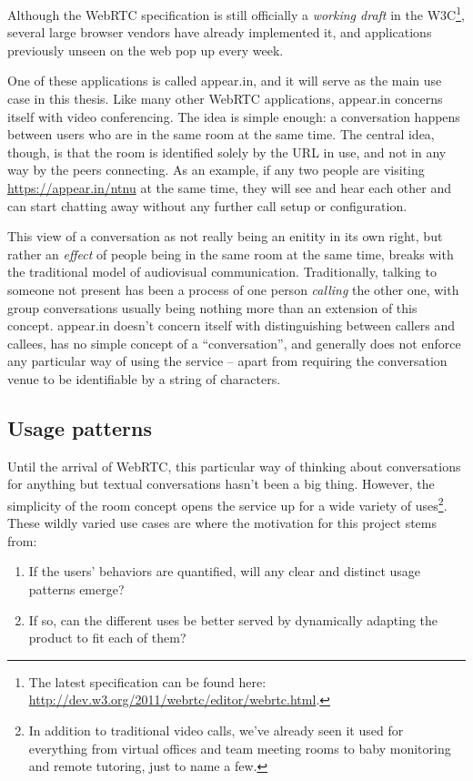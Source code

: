 Although the WebRTC specification is still officially a \emph{working draft} in the W3C\footnote{The latest specification can be found here: \url{http://dev.w3.org/2011/webrtc/editor/webrtc.html}.}, several large browser vendors have already implemented it, and applications previously unseen on the web pop up every week.

One of these applications is called appear.in, and it will serve as the main use case in this thesis. Like many other WebRTC applications, appear.in concerns itself with video conferencing. The idea is simple enough: a conversation happens between users who are in the same room at the same time. The central idea, though, is that the room is identified solely by the URL in use, and not in any way by the peers connecting. As an example, if any two people are visiting \url{https://appear.in/ntnu} at the same time, they will see and hear each other and can start chatting away without any further call setup or configuration.

This view of a conversation as not really being an enitity in its own right, but rather an \emph{effect} of people being in the same room at the same time, breaks with the traditional model of audiovisual communication. Traditionally, talking to someone not present has been a process of one person \emph{calling} the other one, with group conversations usually being nothing more than an extension of this concept. appear.in doesn't concern itself with distinguishing between callers and callees, has no simple concept of a ``conversation'', and generally does not enforce any particular way of using the service -- apart from requiring the conversation venue to be identifiable by a string of characters.

\subsection{Usage patterns}

Until the arrival of WebRTC, this particular way of thinking about conversations for anything but textual conversations hasn't been a big thing. However, the simplicity of the room concept opens the service up for a wide variety of uses\footnote{In addition to traditional video calls, we've already seen it used for everything from virtual offices and team meeting rooms to baby monitoring and remote tutoring, just to name a few.}. These wildly varied use cases are where the motivation for this project stems from:

\begin{enumerate}
  \item If the users' behaviors are quantified, will any clear and distinct usage patterns emerge?
  \item If so, can the different uses be better served by dynamically adapting the product to fit each of them?
\end{enumerate}

